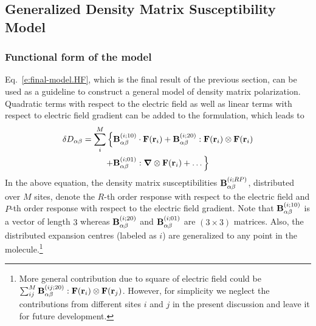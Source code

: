 \documentclass[aip,amsmath,amssymb,reprint,floatfix]{revtex4-1}
\newcommand{\BM}[1]{\bm{#1}}
\begin{document}
\subsection{Generalized Density Matrix Susceptibility Model}

\subsubsection{Functional form of the model}

Eq.~\eqref{e:final-model.HF}, which is the final result of the previous section, 
can be used as a guideline to construct a general model of density matrix polarization.
Quadratic terms with respect to the electric field as well as linear terms with respect to
electric field gradient can be added to the formulation, which leads to
%
\begin{multline}\label{e:final-model.General}
 \delta D_{\alpha\beta} = \sum_{i }^M \Big\{
                                      {\bf B}^{(i ; 10)}_{\alpha\beta} \cdot {\bf F}({\bf r}_i)  
                        +             {\bf B}^{(i ; 20)}_{\alpha\beta} : {\bf F}({\bf r}_i) \otimes {\bf F}({\bf r}_i) \\
                        +             {\bf B}^{(i ; 01)}_{\alpha\beta} : {\BM\nabla} \otimes {\bf F}({\bf r}_i) 
                        + \ldots \Big\}
\end{multline}
%
In the above equation, the density matrix susceptibilities
${\bf B}^{(i; RP)}_{\alpha\beta}$, distributed over $M$ sites,
denote the $R$-th order response with respect to the electric field
and $P$-th order response with respect to the electric field gradient. Note that
${\bf B}^{(i; 10)}_{\alpha\beta}$ is a vector of length $3$ whereas ${\bf B}^{(i; 20)}_{\alpha\beta}$
and ${\bf B}^{(i; 01)}_{\alpha\beta}$ are $(3\times 3)$ matrices. Also, the distributed expansion centres
(labeled as $i$) are generalized to any point in the molecule.\footnote{More general
contribution due to square of electric field could be $\sum_{ij}^M {\bf B}^{(ij; 20)}_{\alpha\beta} : {\bf F}({\bf r}_i) \otimes {\bf F}({\bf r}_j)$. However, for simplicity we neglect the contributions from different sites $i$ and $j$
in the present discussion and leave it for future development.
}
\end{document}
